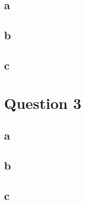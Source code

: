 \documentclass{article}
\begin{document}
\subsection{a}
\subsection{b}
\subsection{c}
\section{Question 3}
\subsection{a}
\subsection{b}
\subsection{c}
\end{document}
